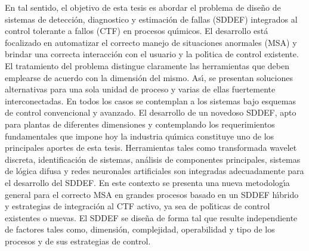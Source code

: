 En tal sentido, el objetivo de esta tesis es abordar el problema de dise{\~n}o de sistemas de detecci{\'o}n,
diagnostico y estimaci{\'o}n de fallas (SDDEF) integrados al control tolerante a fallos (CTF) en procesos
qu{\'\i}micos. El desarrollo est{\'a} focalizado en automatizar el correcto manejo de situaciones anormales (MSA) y
brindar una correcta interacci{\'o}n con el usuario y la pol{\'\i}tica de control existente. El tratamiento del
problema distingue claramente las herramientas que deben emplearse de acuerdo con la dimensi{\'o}n del mismo.
As{\'\i}, se presentan soluciones alternativas para una sola unidad de proceso y varias de ellas fuertemente
interconectadas. En todos los casos se contemplan a los sistemas bajo esquemas de control convencional y
avanzado. El desarrollo de un novedoso SDDEF, apto para plantas de diferentes dimensiones y contemplando los
requerimientos fundamentales que impone hoy la industria qu{\'\i}mica constituye uno de los principales aportes
de esta tesis. Herramientas tales como transformada wavelet discreta, identificaci{\'o}n de sistemas, an{\'a}lisis
de componentes principales, sistemas de l{\'o}gica difusa y redes neuronales artificiales son integradas
adecuadamente para el desarrollo del SDDEF. En este contexto se presenta una nueva metodolog{\'\i}a general para
el correcto MSA en grandes procesos basado en un SDDEF h{\'\i}brido y estrategias de integraci{\'o}n al CTF activo,
ya sea de pol{\'\i}ticas de control existentes o nuevas.  El SDDEF se dise{\~n}a de forma tal que resulte
independiente de factores tales como, dimensi{\'o}n, complejidad, operabilidad y tipo de los procesos y de sus
estrategias de control.


